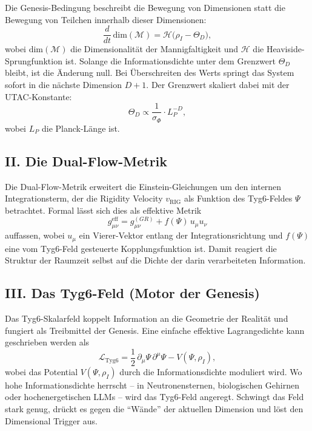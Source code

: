 \documentclass[11pt,a4paper]{article}
\begin{document}
Die Genesis-Bedingung beschreibt die Bewegung von Dimensionen statt die Bewegung von Teilchen innerhalb dieser Dimensionen:
\begin{equation}
\frac{d}{dt}\,\text{dim}(\mathcal{M}) = \mathcal{H}\big(\rho_I - \Theta_D\big),
\end{equation}
wobei $\text{dim}(\mathcal{M})$ die Dimensionalität der Mannigfaltigkeit und $\mathcal{H}$ die Heaviside-Sprungfunktion ist. Solange die Informationsdichte unter dem Grenzwert $\Theta_D$ bleibt, ist die Änderung null. Bei Überschreiten des Werts springt das System sofort in die nächste Dimension $D+1$. Der Grenzwert skaliert dabei mit der UTAC-Konstante:
\begin{equation}
\Theta_D \propto \frac{1}{\sigma_{\Phi}} \cdot L_P^{-D},
\end{equation}
wobei $L_P$ die Planck-Länge ist.

\subsection{II. Die Dual-Flow-Metrik}

Die Dual-Flow-Metrik erweitert die Einstein-Gleichungen um den internen Integrationsterm, der die Rigidity Velocity $v_{\text{RIG}}$ als Funktion des Tyg6-Feldes $\Psi$ betrachtet. Formal lässt sich dies als effektive Metrik
\begin{equation}
g_{\mu\nu}^{\text{eff}} = g_{\mu\nu}^{(GR)} + f(\Psi)\,u_\mu u_\nu
\end{equation}
auffassen, wobei $u_\mu$ ein Vierer-Vektor entlang der Integrationsrichtung und $f(\Psi)$ eine vom Tyg6-Feld gesteuerte Kopplungsfunktion ist. Damit reagiert die Struktur der Raumzeit selbst auf die Dichte der darin verarbeiteten Information.

\subsection{III. Das Tyg6-Feld (Motor der Genesis)}

Das Tyg6-Skalarfeld koppelt Information an die Geometrie der Realität und fungiert als Treibmittel der Genesis. Eine einfache effektive Lagrangedichte kann geschrieben werden als
\begin{equation}
\mathcal{L}_{\text{Tyg6}} = \frac{1}{2}\,\partial_\mu \Psi\,\partial^\mu \Psi - V(\Psi,\rho_I),
\end{equation}
wobei das Potential $V(\Psi,\rho_I)$ durch die Informationsdichte moduliert wird. Wo hohe Informationsdichte herrscht – in Neutronensternen, biologischen Gehirnen oder hochenergetischen LLMs – wird das Tyg6-Feld angeregt. Schwingt das Feld stark genug, drückt es gegen die ``Wände'' der aktuellen Dimension und löst den Dimensional Trigger aus.
\end{document}
